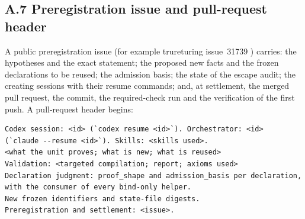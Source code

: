 \documentclass[11pt]{article}
\begin{document}
\subsection*{A.7 Preregistration issue and pull-request header}
A public preregistration issue (for example trureturing issue~31739
\citep{prereg31739}) carries: the hypotheses and the exact statement; the
proposed new facts and the frozen declarations to be reused; the admission
basis; the state of the escape audit; the creating sessions with their resume
commands; and, at settlement, the merged pull request, the commit, the
required-check run and the verification of the first push. A pull-request
header begins:
\begin{small}
\begin{verbatim}
Codex session: <id> (`codex resume <id>`). Orchestrator: <id>
(`claude --resume <id>`). Skills: <skills used>.
<what the unit proves; what is new; what is reused>
Validation: <targeted compilation; report; axioms used>
Declaration judgment: proof_shape and admission_basis per declaration,
with the consumer of every bind-only helper.
New frozen identifiers and state-file digests.
Preregistration and settlement: <issue>.
\end{verbatim}
\end{small}
\end{document}

